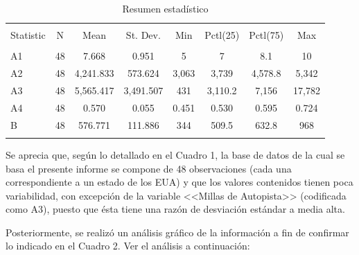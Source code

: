 \documentclass[a4paper,10pt]{article}\usepackage[]{graphicx}\usepackage[]{color}
\begin{document}
\begin{table}[!htbp] \centering 
  \caption{Resumen estadístico} 
  \label{} 
\begin{tabular}{@{\extracolsep{5pt}}lccccccc} 
\\[-1.8ex]\hline 
\hline \\[-1.8ex] 
Statistic & \multicolumn{1}{c}{N} & \multicolumn{1}{c}{Mean} & \multicolumn{1}{c}{St. Dev.} & \multicolumn{1}{c}{Min} & \multicolumn{1}{c}{Pctl(25)} & \multicolumn{1}{c}{Pctl(75)} & \multicolumn{1}{c}{Max} \\ 
\hline \\[-1.8ex] 
A1 & 48 & 7.668 & 0.951 & 5 & 7 & 8.1 & 10 \\ 
A2 & 48 & 4,241.833 & 573.624 & 3,063 & 3,739 & 4,578.8 & 5,342 \\ 
A3 & 48 & 5,565.417 & 3,491.507 & 431 & 3,110.2 & 7,156 & 17,782 \\ 
A4 & 48 & 0.570 & 0.055 & 0.451 & 0.530 & 0.595 & 0.724 \\ 
B & 48 & 576.771 & 111.886 & 344 & 509.5 & 632.8 & 968 \\ 
\hline \\[-1.8ex] 
\end{tabular} 
\end{table} 


Se aprecia que, según lo detallado en el Cuadro 1, la base de datos de la cual se basa el presente informe se compone de 48 observaciones (cada una correspondiente a un estado de los EUA) y que los valores contenidos tienen poca variabilidad, con excepción de la variable <<Millas de Autopista>> (codificada como A3), puesto que ésta tiene una razón de desviación estándar a media alta. 

Posteriormente, se realizó un análisis gráfico de la información a fin de confirmar lo indicado en el Cuadro 2. Ver el análisis a continuación:
\end{document}
